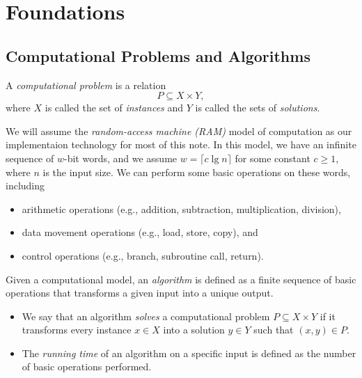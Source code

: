 \chapter{Foundations}
\section{Computational Problems and Algorithms}
\begin{definition}
  A \emph{computational problem} is a relation
  \begin{equation*}
    P \subseteq X \times Y,
  \end{equation*}
  where $X$ is called the set of \emph{instances} and $Y$ is called the sets of
  \emph{solutions}.
\end{definition}

\begin{definition}
  We will assume the \emph{random-access machine (RAM)} model of computation as
  our implementaion technology for most of this note.
  In this model, we have an infinite sequence of $w$-bit words, and we assume
  $w = \lceil c \lg n \rceil$ for some constant $c \geq 1$, where $n$ is the
  input size.
  We can perform some basic operations on these words, including
  \begin{itemize}
    \item arithmetic operations (e.g., addition, subtraction, multiplication,
    division),
    \item data movement operations (e.g., load, store, copy), and
    \item control operations (e.g., branch, subroutine call, return).
  \end{itemize}
\end{definition}

\begin{definition}
  Given a computational model, an \emph{algorithm} is defined as a finite
  sequence of basic operations that transforms a given input into a unique
  output.
  \begin{itemize}
    \item We say that an algorithm \emph{solves} a computational problem
    $P \subseteq X \times Y$ if it transforms every instance $x \in X$ into a
    solution $y \in Y$ such that $(x, y) \in P$.
    \item The \emph{running time} of an algorithm on a specific input is
    defined as the number of basic operations performed.
  \end{itemize}
\end{definition}

